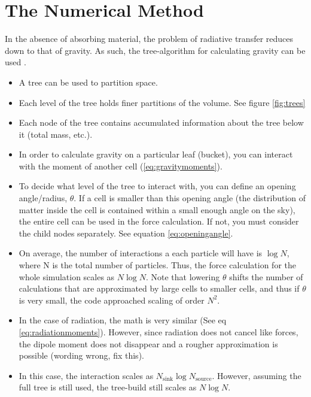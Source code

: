 \pagestyle{fancy}
\headheight 20pt
\chead{}
\lfoot{}
\cfoot{\thepage}
\rfoot{}
\renewcommand{\headrulewidth}{0.1pt}
\renewcommand{\footrulewidth}{0.1pt}

\chapter{The Numerical Method}
\label{chap:method}
\thispagestyle{fancy}

In the absence of absorbing material, the problem of radiative transfer reduces down to that of gravity. As such, the tree-algorithm for calculating gravity can be used \citep{barnesHut86}.

\begin{itemize}
\item A tree can be used to partition space.
\item Each level of the tree holds finer partitions of the volume. See figure \ref{fig:trees}
\item Each node of the tree contains accumulated information about the tree below it (total mass, etc.).
\item In order to calculate gravity on a particular leaf (bucket), you can interact with the moment of another cell (\ref{eq:gravitymoments}).
\item To decide what level of the tree to interact with, you can define an opening angle/radius, $\theta$. If a cell is smaller than this opening angle (the distribution of matter inside the cell is contained within a small enough angle on the sky), the entire cell can be used in the force calculation. If not, you must consider the child nodes separately. See equation \ref{eq:openingangle}.
\item On average, the number of interactions a each particle will have is $\log{N}$, where N is the total number of particles. Thus, the force calculation for the whole simulation scales as $N\log{N}$. Note that lowering $\theta$ shifts the number of calculations that are approximated by large cells to smaller cells, and thus if $\theta$ is very small, the code approached scaling of order $N^2$.
\item In the case of radiation, the math is very similar (See eq \ref{eq:radiationmoments}). However, since radiation does not cancel like forces, the dipole moment does not disappear and a rougher approximation is possible (wording wrong, fix this).
\item In this case, the interaction scales as $N_{\mbox{sink}}\log{N_{\mbox{source}}}$. However, assuming the full tree is still used, the tree-build still scales as $N\log{N}$.
\end{itemize}

